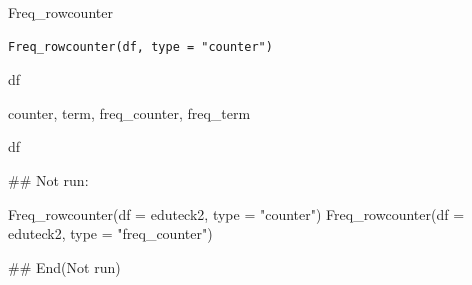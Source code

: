 \documentclass[a4paper]{book}
\begin{document}
%
\begin{Description}
Freq\_rowcounter
\end{Description}
%
\begin{Usage}
\begin{verbatim}
Freq_rowcounter(df, type = "counter")
\end{verbatim}
\end{Usage}
%
\begin{Arguments}
\begin{ldescription}
\item[\code{df}] df

\item[\code{type}] counter, term, freq\_counter, freq\_term
\end{ldescription}
\end{Arguments}
%
\begin{Value}
df
\end{Value}
%
\begin{Examples}
\begin{ExampleCode}
\#\# Not run: 

 Freq_rowcounter(df = eduteck2, type = "counter")
Freq_rowcounter(df = eduteck2, type = "freq_counter")

## End(Not run)
\end{ExampleCode}
\end{Examples}
\end{document}
